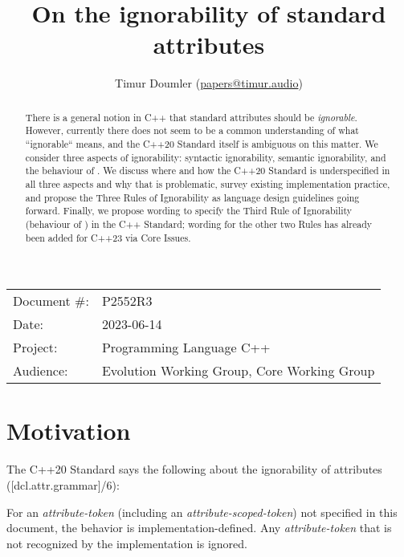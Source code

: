 

\newcommand{\forceindent}{\parindent=1em\indent\parindent=0pt\relax} %


\title{On the ignorability of standard attributes}
\author{
  Timur Doumler \small(\href{mailto:papers@timur.audio}{papers@timur.audio})
}
\date{}
\maketitle

\begin{tabular}{ll}
Document \#: & P2552R3 \\
Date: & 2023-06-14\\
Project: & Programming Language C++ \\
Audience: & Evolution Working Group, Core Working Group
\end{tabular}


\begin{abstract}
There is a general notion in C++ that standard attributes should be \emph{ignorable}. However, currently there does not seem to be a common understanding of what ``ignorable`` means, and the C++20 Standard itself is ambiguous on this matter. We consider three aspects of ignorability: syntactic ignorability, semantic ignorability, and the behaviour of \mbox{}. We discuss where and how the C++20 Standard is underspecified in all three aspects and why that is problematic, survey existing implementation practice, and propose the Three Rules of Ignorability as language design guidelines going forward. Finally, we propose wording to specify the Third Rule of Ignorability (behaviour of \mbox{}) in the C++ Standard; wording for the other two Rules has already been added for C++23 via Core Issues.
\end{abstract}


\section{Motivation}
\label{sec:motivation}


The C++20 Standard says the following about the ignorability of attributes ([dcl.attr.grammar]/6):

\begin{adjustwidth}{0.5cm}{0.5cm}
For an \emph{attribute-token} (including an \emph{attribute-scoped-token})  not specified in this document, the behavior is implementation-defined. Any \emph{attribute-token} that is not recognized by the implementation is ignored.
\end{adjustwidth}

